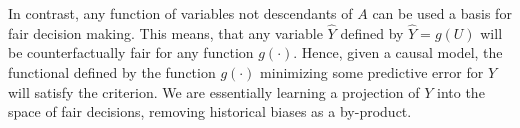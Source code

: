 In contrast, any function of variables not descendants of $A$ can be
used a basis for fair decision making. This means, that any variable
$\hat Y$ defined by $\hat Y = g(U)$ will be counterfactually fair for
any function $g(\cdot)$. Hence, given a causal model, the functional
defined by the function $g(\cdot)$ minimizing some predictive error
for $Y$ will satisfy the criterion. We are essentially learning a
projection of $Y$ into the space of fair decisions, removing historical
biases as a by-product.



